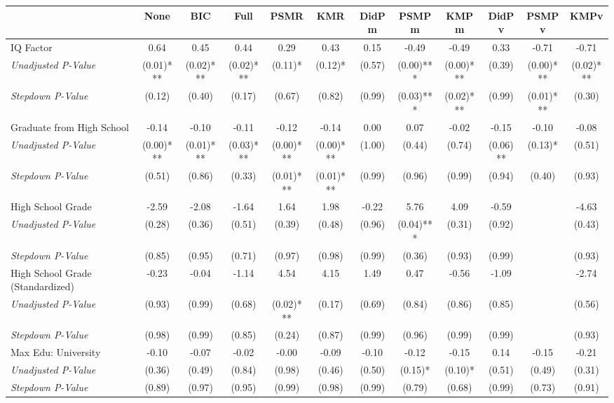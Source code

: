 \begin{tabular}{l c c c c c c c c c c c}
\toprule
 & None & BIC & Full & PSMR & KMR & DidPm & PSMPm & KMPm & DidPv & PSMPv & KMPv \\
\midrule
IQ Factor & 0.64 & 0.45 & 0.44 & 0.29 & 0.43 & 0.15 & -0.49 & -0.49 & 0.33 & -0.71 & -0.71 \\
\quad \textit{Unadjusted P-Value} & (0.01)*** & (0.02)*** & (0.02)*** & (0.11)* & (0.12)* & (0.57) & (0.00)*** & (0.00)*** & (0.39) & (0.00)*** & (0.02)*** \\
\quad \textit{Stepdown P-Value} & (0.12) & (0.40) & (0.17) & (0.67) & (0.82) & (0.99) & (0.03)*** & (0.02)*** & (0.99) & (0.01)*** & (0.30) \\
Graduate from High School & -0.14 & -0.10 & -0.11 & -0.12 & -0.14 & 0.00 & 0.07 & -0.02 & -0.15 & -0.10 & -0.08 \\
\quad \textit{Unadjusted P-Value} & (0.00)*** & (0.01)*** & (0.03)*** & (0.00)*** & (0.00)*** & (1.00) & (0.44) & (0.74) & (0.06)** & (0.13)* & (0.51) \\
\quad \textit{Stepdown P-Value} & (0.51) & (0.86) & (0.33) & (0.01)*** & (0.01)*** & (0.99) & (0.96) & (0.99) & (0.94) & (0.40) & (0.93) \\
High School Grade & -2.59 & -2.08 & -1.64 & 1.64 & 1.98 & -0.22 & 5.76 & 4.09 & -0.59 & & -4.63 \\
\quad \textit{Unadjusted P-Value} & (0.28) & (0.36) & (0.51) & (0.39) & (0.48) & (0.96) & (0.04)*** & (0.31) & (0.92) & & (0.43) \\
\quad \textit{Stepdown P-Value} & (0.85) & (0.95) & (0.71) & (0.97) & (0.98) & (0.99) & (0.36) & (0.93) & (0.99) & & (0.93) \\
High School Grade (Standardized) & -0.23 & -0.04 & -1.14 & 4.54 & 4.15 & 1.49 & 0.47 & -0.56 & -1.09 & & -2.74 \\
\quad \textit{Unadjusted P-Value} & (0.93) & (0.99) & (0.68) & (0.02)*** & (0.17) & (0.69) & (0.84) & (0.86) & (0.85) & & (0.56) \\
\quad \textit{Stepdown P-Value} & (0.98) & (0.99) & (0.85) & (0.24) & (0.87) & (0.99) & (0.96) & (0.99) & (0.99) & & (0.93) \\
Max Edu: University & -0.10 & -0.07 & -0.02 & -0.00 & -0.09 & -0.10 & -0.12 & -0.15 & 0.14 & -0.15 & -0.21 \\
\quad \textit{Unadjusted P-Value} & (0.36) & (0.49) & (0.84) & (0.98) & (0.46) & (0.50) & (0.15)* & (0.10)* & (0.51) & (0.49) & (0.31) \\
\quad \textit{Stepdown P-Value} & (0.89) & (0.97) & (0.95) & (0.99) & (0.98) & (0.99) & (0.79) & (0.68) & (0.99) & (0.73) & (0.91) \\

\end{tabular}
